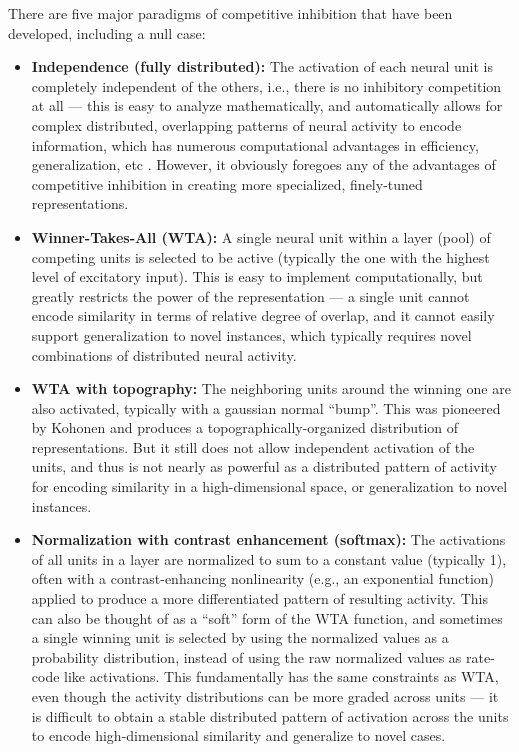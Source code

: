 \documentclass[11pt,twoside]{article}
\begin{document}
There are five major paradigms of competitive inhibition that have been developed, including a null case:
\begin{itemize}
\item {\bf Independence (fully distributed):} The activation of each neural unit is completely independent of the others, i.e., there is no inhibitory competition at all --- this is easy to analyze mathematically, and automatically allows for complex distributed, overlapping patterns of neural activity to encode information, which has numerous computational advantages in efficiency, generalization, etc \cite{Rumelhart}.  However, it obviously foregoes any of the advantages of competitive inhibition in creating more specialized, finely-tuned representations.
\item {\bf Winner-Takes-All (WTA):} A single neural unit within a layer (pool) of competing units is selected to be active  (typically the one with the highest level of excitatory input).  This is easy to implement computationally, but greatly restricts the power of the representation --- a single unit cannot encode similarity in terms of relative degree of overlap, and it cannot easily support generalization to novel instances, which typically requires novel combinations of distributed neural activity.
\item {\bf WTA with topography:} The neighboring units around the winning one are also activated, typically with a gaussian normal ``bump''.  This was pioneered by Kohonen and produces a topographically-organized distribution of representations.  But it still does not allow independent activation of the units, and thus is not nearly as powerful as a distributed pattern of activity for encoding similarity in a high-dimensional space, or generalization to novel instances.
\item {\bf Normalization with contrast enhancement (softmax):} The activations of all units in a layer are normalized to sum to a constant value (typically 1), often with a contrast-enhancing nonlinearity (e.g., an exponential function) applied to produce a more differentiated pattern of resulting activity.  This can also be thought of as a ``soft'' form of the WTA function, and sometimes a single winning unit is selected by using the normalized values as a probability distribution, instead of using the raw normalized values as rate-code like activations.  This fundamentally has the same constraints as WTA, even though the activity distributions can be more graded across units --- it is difficult to obtain a stable distributed pattern of activation across the units to encode high-dimensional similarity and generalize to novel cases.

\end{itemize}
\end{document}
